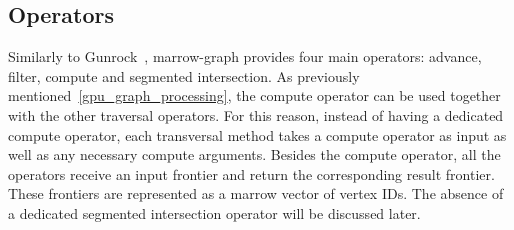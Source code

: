
\subsection{Operators}

Similarly to Gunrock~\cite{paper:gunrock}, marrow-graph provides four main operators: advance, filter, compute and segmented intersection. As previously mentioned~\ref{gpu_graph_processing}, the compute operator can be used together with the other traversal operators. For this reason, instead of having a dedicated compute operator, each transversal method takes a compute operator as input as well as any necessary compute arguments. Besides the compute operator, all the operators receive an input frontier and return the corresponding result frontier. These frontiers are represented as a marrow vector of vertex IDs. The absence of a dedicated segmented intersection operator will be discussed later.

